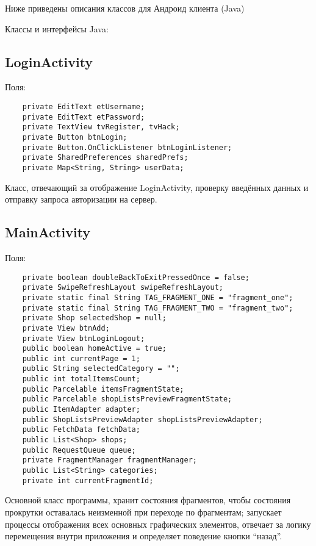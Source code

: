 Ниже приведены описания классов для Андроид клиента (Java)

Классы и интерфейсы Java:

\subsection{LoginActivity}
Поля:\\
\begin{small}
    \begin{verbatim}
    private EditText etUsername;
    private EditText etPassword;
    private TextView tvRegister, tvHack;
    private Button btnLogin;
    private Button.OnClickListener btnLoginListener;
    private SharedPreferences sharedPrefs;
    private Map<String, String> userData;
    \end{verbatim}
\end{small}
Класс, отвечающий за отображение LoginActivity, проверку введённых данных и отправку запроса авторизации на сервер.

\subsection{MainActivity}
Поля:\\
\begin{small}
    \begin{verbatim}
    private boolean doubleBackToExitPressedOnce = false;
    private SwipeRefreshLayout swipeRefreshLayout;
    private static final String TAG_FRAGMENT_ONE = "fragment_one";
    private static final String TAG_FRAGMENT_TWO = "fragment_two";
    private Shop selectedShop = null;
    private View btnAdd;
    private View btnLoginLogout;
    public boolean homeActive = true;
    public int currentPage = 1;
    public String selectedCategory = "";
    public int totalItemsCount;
    public Parcelable itemsFragmentState;
    public Parcelable shopListsPreviewFragmentState;
    public ItemAdapter adapter;
    public ShopListsPreviewAdapter shopListsPreviewAdapter;
    public FetchData fetchData;
    public List<Shop> shops;
    public RequestQueue queue;
    private FragmentManager fragmentManager;
    public List<String> categories;
    private int currentFragmentId;
    \end{verbatim}
\end{small}
Основной класс программы, хранит состояния фрагментов, чтобы состояния прокрутки оставалась неизменной при переходе по фрагментам; запускает процессы отображения всех основных графических элементов, отвечает за логику перемещения внутри приложения и определяет поведение кнопки ``назад''.

